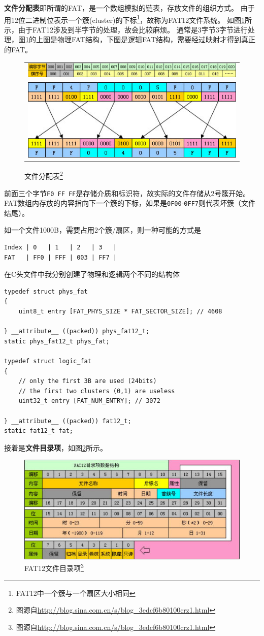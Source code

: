 \documentclass[logo,reportComp]{thesis}
\begin{document}
\textbf{文件分配表}即所谓的FAT，是一个数组模拟的链表，存放文件的组织方式。
由于用12位二进制位表示一个簇(cluster)的下标\footnote{FAT12中一个簇与一个扇区大小相同}，故称为FAT12文件系统。
如图\ref{fig:fat}所示，由于FAT12涉及到半字节的处理，故会比较麻烦。
通常是3字节3字节进行处理，图\ref{fig:fat}的上图是物理FAT结构，下图是逻辑FAT结构，需要经过映射才得到真正的FAT。
\begin{figure}[H]
\centering
\begin{tabular}{c}
\includegraphics[width=0.6\linewidth]{fig/fat_1.jpg}\\
\includegraphics[width=0.6\linewidth]{fig/fat_2.jpg}
\end{tabular}
\caption{文件分配表\protect\footnote{图源自\url{http://blog.sina.com.cn/s/blog_3edcf6b80100crz1.html}}}
\label{fig:fat}
\end{figure}

前面三个字节\verb'F0 FF FF'是存储介质和标识符，故实际的文件存储从2号簇开始。
FAT数组内存放的内容指向下一个簇的下标，如果是\verb'0F00'-\verb'0FF7'则代表坏簇（文件结尾）。

如一个文件1000B，需要占用2个簇/扇区，则一种可能的方式是
\begin{lstlisting}
Index | 0   | 1   | 2   | 3   |
FAT   | FF0 | FFF | 003 | FF7 |
\end{lstlisting}

在C头文件中我分别创建了物理和逻辑两个不同的结构体
\begin{lstlisting}
typedef struct phys_fat
{
	uint8_t entry [FAT_PHYS_SIZE * FAT_SECTOR_SIZE]; // 4608

} __attribute__ ((packed)) phys_fat12_t;
static phys_fat12_t phys_fat;

typedef struct logic_fat
{
	// only the first 3B are used (24bits)
	// the first two clusters (0,1) are useless
	uint32_t entry [FAT_NUM_ENTRY]; // 3072

} __attribute__ ((packed)) fat12_t;
static fat12_t fat;
\end{lstlisting}

接着是\textbf{文件目录项}，如图\ref{fig:directory}所示。
\begin{figure}[H]
\centering
\includegraphics[width=0.6\linewidth]{fig/fat12_directory_entry.jpg}
\caption{FAT12文件目录项\protect\footnote{图源自\url{http://blog.sina.com.cn/s/blog_3edcf6b80100crz1.html}}}
\label{fig:directory}
\end{figure}
\end{document}
